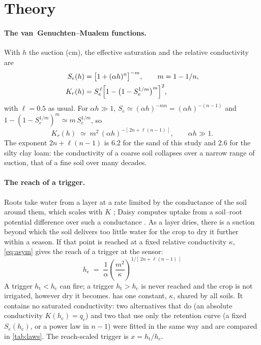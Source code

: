\documentclass[preprint,12pt,authoryear]{elsarticle}
\newcommand{\hc}{h_{\mathrm{c}}}
\newcommand{\htr}{h_{\mathrm{t}}}
\begin{document}
\section{Theory}
\paragraph{The van~Genuchten--Mualem functions.}
With $h$ the suction (cm), the effective saturation and the relative conductivity are \citep{vanGenuchten1980,Mualem1976}
\begin{align}
S_e(h) &= \bigl[1+(\alpha h)^{n}\bigr]^{-m},\qquad m=1-1/n, \label{eq:vg}\\
K_r(h) &= S_e^{\,\ell}\Bigl[1-\bigl(1-S_e^{1/m}\bigr)^{m}\Bigr]^{2}, \label{eq:kr}
\end{align}
with $\ell=0.5$ as usual. For $\alpha h\gg1$, $S_e\simeq(\alpha h)^{-mn}=(\alpha h)^{-(n-1)}$ and $1-(1-S_e^{1/m})^{m}\simeq m\,S_e^{1/m}$, so
\begin{equation}
K_r(h)\;\simeq\;m^{2}\,(\alpha h)^{-[\,2n+\ell(n-1)\,]}, \qquad \alpha h\gg1.
\label{eq:asym}
\end{equation}
The exponent $2n+\ell(n-1)$ is 6.2 for the sand of this study and 2.6 for the silty clay loam: the conductivity of a coarse soil collapses over a narrow range of suction, that of a fine soil over many decades.

\paragraph{The reach of a trigger.}
Roots take water from a layer at a rate limited by the conductance of the soil around them, which scales with $K$ \citep{Gardner1960,Carminati2020}; Daisy computes uptake from a soil--root potential difference over such a conductance \citep{Hansen1990,Abrahamsen2000}. As a layer dries, there is a suction beyond which the soil delivers too little water for the crop to dry it further within a season. If that point is reached at a fixed relative conductivity $\kappa$, \cref{eq:asym} gives the reach of a trigger at the sensor:
\begin{equation}
\boxed{\;\hc \;=\; \frac{1}{\alpha}\left(\frac{m^{2}}{\kappa}\right)^{1/[\,2n+\ell(n-1)\,]}\;}
\label{eq:hc}
\end{equation}
A trigger $\htr<\hc$ can fire; a trigger $\htr>\hc$ is never reached and the crop is not irrigated, however dry it becomes.  has one constant, $\kappa$, shared by all soils. It contains no saturated conductivity: two alternatives that do (an absolute conductivity $K(\hc)=q_c$) and two that use only the retention curve (a fixed $S_e(\hc)$, or a power law in $n-1$) were fitted in the same way and are compared in \cref{tab:laws}. The reach-scaled trigger is $x=\htr/\hc$.
\end{document}
